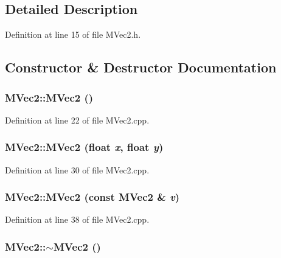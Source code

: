 \subsection{Detailed Description}


Definition at line 15 of file MVec2.h.

\subsection{Constructor \& Destructor Documentation}
\hypertarget{class_m_vec2_5f7fa1ab60ce17787084fc30c4da182e}{
\subsubsection[{MVec2}]{\setlength{\rightskip}{0pt plus 5cm}MVec2::MVec2 ()}}
\label{class_m_vec2_5f7fa1ab60ce17787084fc30c4da182e}




Definition at line 22 of file MVec2.cpp.\hypertarget{class_m_vec2_c57b50f9f0f4e94bf2b4b863f000b2f4}{
\subsubsection[{MVec2}]{\setlength{\rightskip}{0pt plus 5cm}MVec2::MVec2 (float {\em x}, \/  float {\em y})}}
\label{class_m_vec2_c57b50f9f0f4e94bf2b4b863f000b2f4}




Definition at line 30 of file MVec2.cpp.\hypertarget{class_m_vec2_34d3ade6ee666dec157f5c82ab908db0}{
\subsubsection[{MVec2}]{\setlength{\rightskip}{0pt plus 5cm}MVec2::MVec2 (const {\bf MVec2} \& {\em v})}}
\label{class_m_vec2_34d3ade6ee666dec157f5c82ab908db0}




Definition at line 38 of file MVec2.cpp.\hypertarget{class_m_vec2_17095d92765eed4b3e9248d6c2b2a794}{
\subsubsection[{$\sim$MVec2}]{\setlength{\rightskip}{0pt plus 5cm}MVec2::$\sim$MVec2 ()}}
\label{class_m_vec2_17095d92765eed4b3e9248d6c2b2a794}




